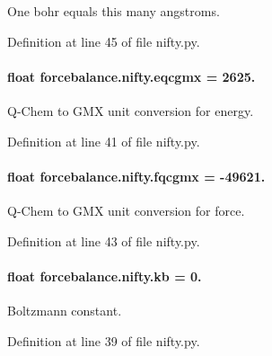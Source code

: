 One bohr equals this many angstroms. 



Definition at line 45 of file nifty.\-py.

\hypertarget{namespaceforcebalance_1_1nifty_a7cec4d46378b888cd867de05d0168d96}{
\paragraph[{eqcgmx}]{\setlength{\rightskip}{0pt plus 5cm}float forcebalance.\-nifty.\-eqcgmx = 2625.}}\label{namespaceforcebalance_1_1nifty_a7cec4d46378b888cd867de05d0168d96}


Q-\/\-Chem to G\-M\-X unit conversion for energy. 



Definition at line 41 of file nifty.\-py.

\hypertarget{namespaceforcebalance_1_1nifty_ab1ec21beaae0d8328e7e4c3b89d972ab}{
\paragraph[{fqcgmx}]{\setlength{\rightskip}{0pt plus 5cm}float forcebalance.\-nifty.\-fqcgmx = -\/49621.}}\label{namespaceforcebalance_1_1nifty_ab1ec21beaae0d8328e7e4c3b89d972ab}


Q-\/\-Chem to G\-M\-X unit conversion for force. 



Definition at line 43 of file nifty.\-py.

\hypertarget{namespaceforcebalance_1_1nifty_ae0916a3186f4f8b238a0d58bb9f6a3da}{
\paragraph[{kb}]{\setlength{\rightskip}{0pt plus 5cm}float forcebalance.\-nifty.\-kb = 0.}}\label{namespaceforcebalance_1_1nifty_ae0916a3186f4f8b238a0d58bb9f6a3da}


Boltzmann constant. 



Definition at line 39 of file nifty.\-py.

